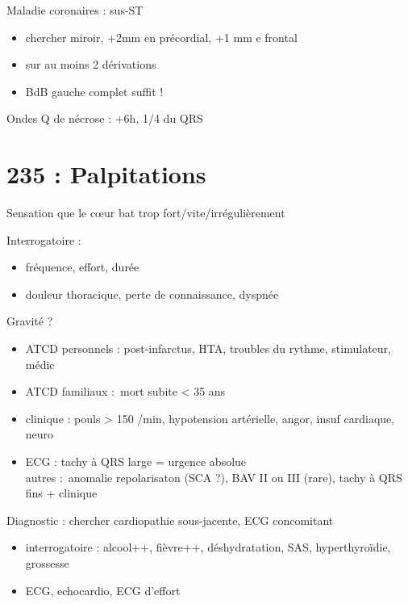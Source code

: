 Maladie coronaires : sus-ST
\begin{itemize}
  \item chercher miroir, +2mm en précordial, +1 mm e frontal
  \item sur au moins 2 dérivations
  \item BdB gauche complet suffit !
\end{itemize}
Ondes Q de nécrose : +6h, 1/4 du QRS

\section{235 : Palpitations}%
\label{sec:235_palpitations}
Sensation que le c\oe{}ur bat trop fort/vite/irrégulièrement

Interrogatoire : 
\begin{itemize}
  \item fréquence, effort, durée
  \item \danger{} douleur thoracique, perte de connaissance, dyspnée
\end{itemize}
Gravité ?
\begin{itemize}
  \item ATCD personnels : post-infarctus, HTA, troubles du rythme, stimulateur,
    médic
  \item ATCD familiaux : mort subite < 35 ans
  \item clinique : pouls > 150 /min, hypotension artérielle, angor, insuf
    cardiaque, neuro
  \item ECG : tachy à QRS large = urgence absolue \skull\\
    autres : anomalie repolarisaton (SCA ?), BAV II ou III (rare), tachy à QRS
    fins + clinique
\end{itemize}
Diagnostic : chercher cardiopathie sous-jacente, ECG concomitant
\begin{itemize}
  \item interrogatoire : alcool++, fièvre++, déshydratation, SAS,
    hyperthyroïdie, grossesse
  \item ECG, echocardio, ECG d'effort
\end{itemize}

